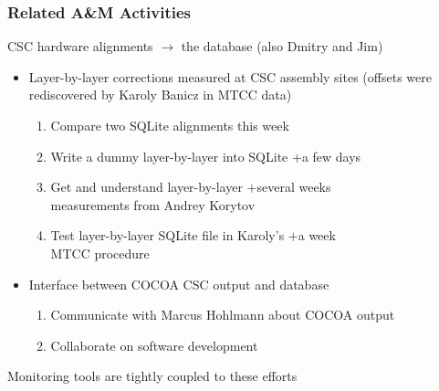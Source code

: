 \documentclass[compress]{beamer}
\begin{document}
\begin{frame}
\frametitle{Related A\&M Activities}

CSC hardware alignments $\to$ the database (also Dmitry and Jim)

\vspace{0.1 cm}
\begin{itemize}\setlength{\itemsep}{0.25 cm}
\item Layer-by-layer corrections measured at CSC assembly sites
(offsets were rediscovered by Karoly Banicz in MTCC data)
\begin{enumerate}
\item Compare two SQLite alignments \hfill this week
\item Write a dummy layer-by-layer into SQLite \hfill $+$a few days
\item Get and understand layer-by-layer \hfill $+$several weeks \\ measurements from Andrey Korytov
\item Test layer-by-layer SQLite file in Karoly's \hfill $+$a week \\ MTCC procedure
\end{enumerate}
\item Interface between COCOA CSC output and database
\begin{enumerate}
\item Communicate with Marcus Hohlmann about COCOA output
\item Collaborate on software development
\end{enumerate}
\end{itemize}

\vspace{0.1 cm} Monitoring tools are tightly coupled to these efforts

\label{numpages}
\end{frame}
\end{document}
